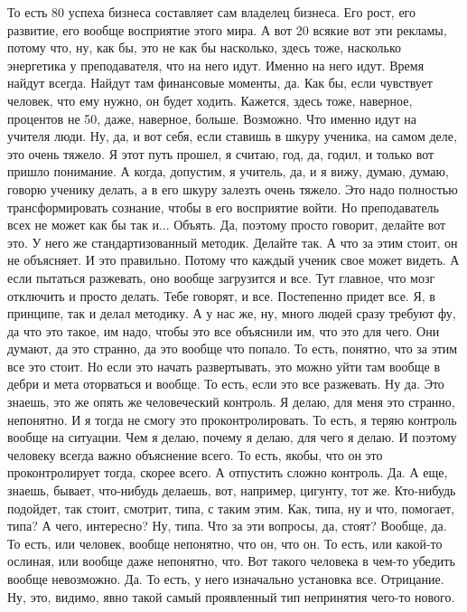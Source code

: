 То есть 80%
успеха бизнеса составляет
сам
владелец бизнеса.
Его рост, его развитие,
его вообще восприятие этого мира.
А вот 20%
всякие вот эти рекламы,
потому что, ну, как бы,
это не как бы насколько,
здесь тоже, насколько энергетика у преподавателя,
что на него идут.
Именно на него идут.
Время найдут всегда.
Найдут там
финансовые моменты, да.
Как бы, если чувствует человек,
что ему нужно, он будет ходить.
Кажется, здесь тоже, наверное,
процентов не 50, даже, наверное, больше.
Возможно.
Что именно идут на учителя
люди.
Ну, да, и вот себя, если
ставишь в шкуру ученика,
на самом деле,
это очень тяжело.
Я этот путь прошел, я считаю, год, да,
годил, и только вот пришло понимание.
А когда, допустим, я учитель,
да, и я вижу,
думаю, думаю, говорю ученику делать,
а в его шкуру залезть очень тяжело.
Это надо полностью
трансформировать сознание, чтобы
в его восприятие войти.
Но
преподаватель всех не может как бы так
и... Объять. Да, поэтому
просто говорит, делайте вот это.
У него же стандартизованный методик.
Делайте так. А что за этим
стоит, он не объясняет. И это правильно.
Потому что каждый ученик свое может
видеть. А если пытаться разжевать,
оно вообще загрузится и все.
Тут главное, что мозг отключить
и просто делать. Тебе говорят, и все.
Постепенно придет все.
Я, в принципе,
так и делал методику.
А у нас же, ну,
много людей сразу требуют
фу, да что это такое, им надо,
чтобы это все объяснили им,
что это для чего. Они думают, да это
странно, да это вообще что попало.
То есть, понятно,
что за этим все это стоит. Но если это
начать развертывать, это
можно уйти там вообще в дебри и
мета оторваться и вообще.
То есть, если это все разжевать.
Ну да. Это знаешь, это же опять же
человеческий контроль. Я делаю,
для меня это странно, непонятно.
И я тогда не смогу это проконтролировать.
То есть, я теряю контроль вообще на ситуации.
Чем я делаю, почему я
делаю, для чего я делаю. И поэтому
человеку всегда важно объяснение всего.
То есть, якобы, что он это проконтролирует
тогда, скорее всего.
А отпустить сложно контроль.
Да. А еще, знаешь, бывает,
что-нибудь делаешь, вот, например, цигунту,
тот же. Кто-нибудь подойдет, так стоит,
смотрит, типа, с таким этим.
Как, типа, ну и
что, помогает, типа?
А чего, интересно?
Ну, типа. Что за эти вопросы, да, стоят?
Вообще, да. То есть, или человек,
вообще непонятно, что он, что он.
То есть, или какой-то
ослиная, или вообще даже
непонятно, что. Вот такого человека
в чем-то убедить вообще невозможно.
Да.
То есть, у него изначально установка
все. Отрицание.
Ну, это, видимо, явно
такой самый
проявленный тип
непринятия чего-то нового.
